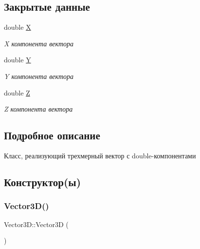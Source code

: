 \subsection*{Закрытые данные}
\begin{DoxyCompactItemize}
\item 
\mbox{\label{class_vector3_d_af75e92fa1c54d30c576ec5730ae8912d}} 
double \mbox{\hyperlink{class_vector3_d_af75e92fa1c54d30c576ec5730ae8912d}{X}}
\begin{DoxyCompactList}\small\item\em X компонента вектора \end{DoxyCompactList}\item 
\mbox{\label{class_vector3_d_a6900dbbb9cfeaa8c96acde6adc01fea4}} 
double \mbox{\hyperlink{class_vector3_d_a6900dbbb9cfeaa8c96acde6adc01fea4}{Y}}
\begin{DoxyCompactList}\small\item\em Y компонента вектора \end{DoxyCompactList}\item 
\mbox{\label{class_vector3_d_a44bb438bbffea59864149151096db764}} 
double \mbox{\hyperlink{class_vector3_d_a44bb438bbffea59864149151096db764}{Z}}
\begin{DoxyCompactList}\small\item\em Z компонента вектора \end{DoxyCompactList}\end{DoxyCompactItemize}


\subsection{Подробное описание}
Класс, реализующий трехмерный вектор с double-\/компонентами 

\subsection{Конструктор(ы)}
\mbox{\label{class_vector3_d_a0b11a8d75da427b27443d8a94d0d296c}} 
\subsubsection{\texorpdfstring{Vector3\+D()}{Vector3D()}\hspace{0.1cm}{\footnotesize\ttfamily [1/2]}}
{\footnotesize\ttfamily Vector3\+D\+::\+Vector3D (\begin{DoxyParamCaption}{ }\end{DoxyParamCaption})}

